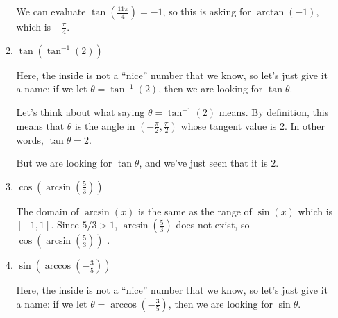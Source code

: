 \documentclass{article}
\begin{document}
\begin{enumerate}
\begin{multicols}{2}
\begin{enumerate}
    \begin{solution}
      We can evaluate $\tan \left( \frac{11 \pi}{4} \right) = -1$, so this
      is asking for $\arctan (-1)$, which is $\boxed{-\frac{\pi}{4}}$.
    \end{solution}

  \item
    \begin{problem}
      $\tan(\tan^{-1}(2))$
    \end{problem}
    \pspace{1.5in}
    
    \strut

    \begin{solution}
      Here, the inside is not a ``nice'' number that we know, so let's
      just give it a name: if we let $\theta = \tan^{-1} (2)$, then we are
      looking for $\tan \theta$.

      Let's think about what saying $\theta = \tan^{-1}(2)$ means.  By
      definition, this means that $\theta$ is the angle in $\left( -
        \frac{\pi}{2}, \frac{\pi}{2} \right)$ whose tangent value is 2.
      In other words, $\tan \theta = 2$.

      But we are looking for $\tan \theta$, and we've just seen that it is
      $\boxed{2}$. 
    \end{solution}

    \columnbreak

  \item
    \begin{problem}
      $\cos\!\left(\arcsin\left(\frac{5}{3}\right)\right)$
    \end{problem}
    \pspace{1.5in}

    \begin{solution}
      The domain of $\arcsin(x)$ is the same as the range of $\sin(x)$
      which is $[-1,1]$. Since $5/3>1$, $\arcsin\left(\frac{5}{3}\right)$
      does not exist, so $\cos \left( \arcsin \left( \frac{5}{3} \right)
      \right)$ .
    \end{solution}

  \item
    \begin{problem}
      $\sin\!\left(\arccos\left(- \frac{3}{5}\right)\right)$
    \end{problem}
    \pspace{1.5in} 

    \begin{solution}
      Here, the inside is not a ``nice'' number that we know, so let's
      just give it a name: if we let $\theta = \arccos \left( - \frac{3}{5}
      \right)$, then we are looking for $\sin \theta$.


\end{solution}
\end{enumerate}
\end{multicols}
\end{enumerate}
\end{document}

